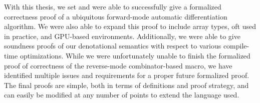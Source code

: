 With this thesis, we set and were able to successfully give a formalized correctness proof of a ubiquitous forward-mode automatic differentiation algorithm.
We were also able to expand this proof to include array types, oft used in practice, and GPU-based environments.
Additionally, we were able to give soundness proofs of our denotational semantics with respect to various compile-time optimizations.
While we were unfortunately unable to finish the formalized proof of correctness of the reverse-mode combinator-based macro, we have identified multiple issues and requirements for a proper future formalized proof.
The final proofs are simple, both in terms of definitions and proof strategy, and can easily be modified at any number of points to extend the language used.

